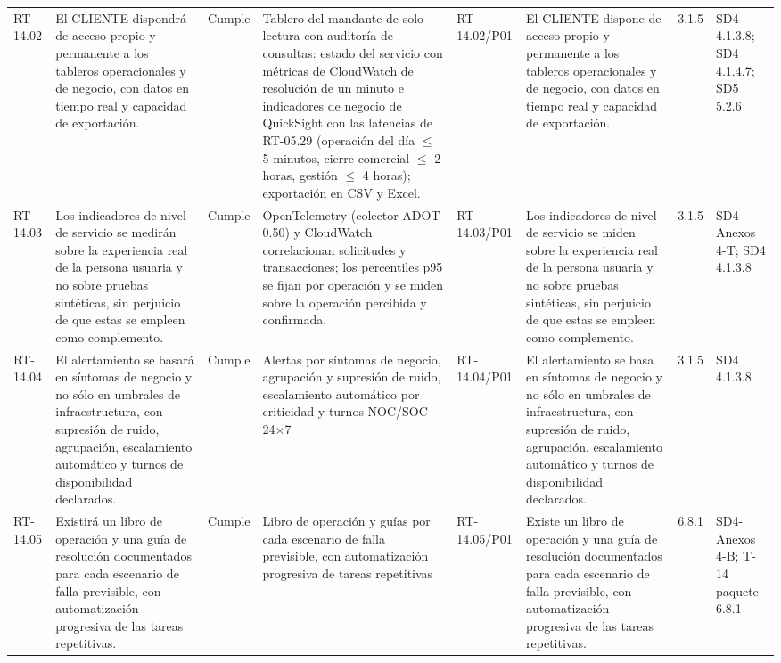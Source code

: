 \documentclass[oficio,firma,final]{lafrox}
\begin{document}
\begin{landscape}
{\begin{longtable}{@{}F{0.054} F{0.173} F{0.061} F{0.191} F{0.106} F{0.180} F{0.067} F{0.168}@{}}
  RT-14.02 & El CLIENTE dispondrá de acceso propio y permanente a los tableros operacionales y de negocio, con datos en tiempo real y capacidad de exportación. & Cumple & Tablero del mandante de solo lectura con auditoría de consultas: estado del servicio con métricas de CloudWatch de resolución de un minuto e indicadores de negocio de QuickSight con las latencias de RT-05.29 (operación del día $\leq$ 5 minutos, cierre comercial $\leq$ 2 horas, gestión $\leq$ 4 horas); exportación en CSV y Excel. & RT-14.02/\allowbreak{}P01 & El CLIENTE dispone de acceso propio y permanente a los tableros operacionales y de negocio, con datos en tiempo real y capacidad de exportación. & 3.1.5 & SD4 4.1.3.8; SD4 4.1.4.7; SD5 5.2.6  \\
  RT-14.03 & Los indicadores de nivel de servicio se medirán sobre la experiencia real de la persona usuaria y no sobre pruebas sintéticas, sin perjuicio de que estas se empleen como complemento. & Cumple & OpenTelemetry (colector ADOT 0.50) y CloudWatch correlacionan solicitudes y transacciones; los percentiles p95 se fijan por operación y se miden sobre la operación percibida y confirmada. & RT-14.03/\allowbreak{}P01 & Los indicadores de nivel de servicio se miden sobre la experiencia real de la persona usuaria y no sobre pruebas sintéticas, sin perjuicio de que estas se empleen como complemento. & 3.1.5 & SD4-Anexos 4-T; SD4 4.1.3.8  \\
  RT-14.04 & El alertamiento se basará en síntomas de negocio y no sólo en umbrales de infraestructura, con supresión de ruido, agrupación, escalamiento automático y turnos de disponibilidad declarados. & Cumple & Alertas por síntomas de negocio, agrupación y supresión de ruido, escalamiento automático por criticidad y turnos NOC/SOC 24$\times$7 & RT-14.04/\allowbreak{}P01 & El alertamiento se basa en síntomas de negocio y no sólo en umbrales de infraestructura, con supresión de ruido, agrupación, escalamiento automático y turnos de disponibilidad declarados. & 3.1.5 & SD4 4.1.3.8  \\
  RT-14.05 & Existirá un libro de operación y una guía de resolución documentados para cada escenario de falla previsible, con automatización progresiva de las tareas repetitivas. & Cumple & Libro de operación y guías por cada escenario de falla previsible, con automatización progresiva de tareas repetitivas & RT-14.05/\allowbreak{}P01 & Existe un libro de operación y una guía de resolución documentados para cada escenario de falla previsible, con automatización progresiva de las tareas repetitivas. & 6.8.1 & SD4-Anexos 4-B; T-14 paquete 6.8.1  \\

\end{longtable}}
\end{landscape}
\end{document}
